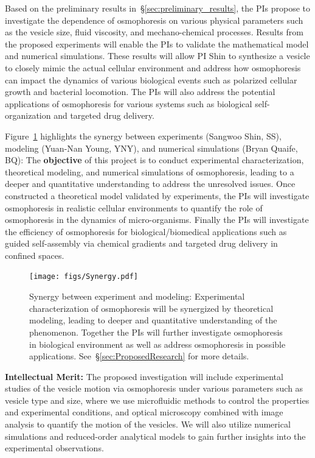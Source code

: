\documentclass[11pt]{article}
\begin{document}
Based on the preliminary results in~\S\ref{sec:preliminary_results}, the
PIs propose to investigate the dependence of osmophoresis on various
physical parameters such as the vesicle size, fluid viscosity, and
mechano-chemical processes.  Results from the proposed experiments will
enable the PIs to validate the mathematical model and numerical
simulations.  These results will allow PI Shin to synthesize a vesicle
to closely mimic the actual cellular environment and address how
osmophoresis can impact the dynamics of various biological events such
as polarized cellular growth and bacterial locomotion.  The PIs will
also address the potential applications of osmophoresis for various
systems such as biological self-organization and targeted drug delivery.

Figure~\ref{fig:synergy} highlights the synergy between experiments
(Sangwoo Shin, SS), modeling (Yuan-Nan Young, YNY), and numerical
simulations (Bryan Quaife, BQ): The {\bf objective} of this project is
to conduct experimental characterization, theoretical modeling, and
numerical simulations of osmophoresis, leading to a deeper and
quantitative understanding to address the unresolved issues.  Once
constructed a theoretical model validated by experiments, the PIs will
investigate osmophoresis in realistic cellular environments to quantify
the role of osmophoresis in the dynamics of micro-organisms.  Finally
the PIs will investigate the efficiency of osmophoresis for
biological/biomedical applications such as guided self-assembly via
chemical gradients and targeted drug delivery in confined spaces.
%
\begin{figure}[h]
\begin{center}
\texttt{[image: figs/Synergy.pdf]}
\caption{\label{fig:synergy} Synergy between experiment and modeling:
  Experimental characterization of osmophoresis will be synergized by
  theoretical modeling, leading to deeper and quantitative understanding
  of the phenomenon. Together the PIs will  further  investigate
  osmophoresis in biological environment as well as address osmophoresis
  in possible applications. See~\S\ref{sec:ProposedResearch} for more
  details.}
\end{center}
\end{figure}

\noindent
{\bf Intellectual Merit:}
The proposed investigation will include experimental studies of the
vesicle motion via osmophoresis under various parameters such as vesicle
type and size, where we use microfluidic methods to control the
properties and experimental conditions, and optical microscopy combined
with image analysis to quantify the motion of the vesicles. We will also
utilize numerical simulations and reduced-order analytical models to
gain further insights into the experimental observations.
\end{document}
